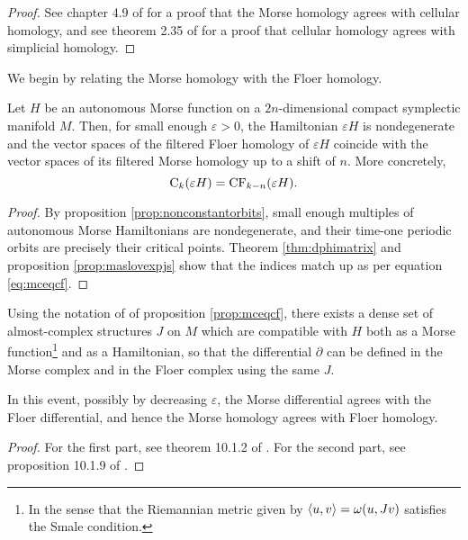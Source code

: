 \begin{proof}
See chapter 4.9 of \cite{audin} for a proof that the Morse homology agrees with cellular homology, and see theorem 2.35 of \cite{hatcher} for a proof that cellular homology agrees with simplicial homology.
\end{proof}

We begin by relating the Morse homology with the Floer homology.

\begin{prop}\label{prop:mceqcf}
Let $H$ be an autonomous Morse function on a $2n$-dimensional compact symplectic manifold $M$. Then, for small enough $\varepsilon > 0$, the Hamiltonian $\varepsilon H$ is nondegenerate and the vector spaces of the filtered Floer homology of $\varepsilon H$ coincide with the vector spaces of its filtered Morse homology up to a shift of $n$. More concretely,
\begin{equation}\label{eq:mceqcf}
\mathrm{C}_k(\varepsilon H) = \mathrm{CF}_{k-n}(\varepsilon H). 
\end{equation}
\end{prop}

\begin{proof}
By proposition \ref{prop:nonconstantorbits}, small enough multiples of autonomous Morse Hamiltonians are nondegenerate, and their time-one periodic orbits are precisely their critical points. Theorem \ref{thm:dphimatrix} and proposition \ref{prop:maslovexpjs} show that the indices match up as per equation \eqref{eq:mceqcf}.
\end{proof}

\begin{prop}\label{prop:mdeqfd}
Using the notation of of proposition \ref{prop:mceqcf}, there exists a dense set of almost-complex structures $J$ on $M$ which are compatible with $H$ both as a Morse function\footnote{In the sense that the Riemannian metric given by $\langle u,v\rangle = \omega(u, Jv)$ satisfies the Smale condition.} and as a Hamiltonian, so that the differential $\partial$ can be defined in the Morse complex and in the Floer complex using the same $J$.

In this event, possibly by decreasing $\varepsilon$, the Morse differential agrees with the Floer differential, and hence the Morse homology agrees with Floer homology.
\end{prop}

\begin{proof}
For the first part, see theorem 10.1.2 of \cite{audin}. For the second part, see proposition 10.1.9 of \cite{audin}.
\end{proof}

